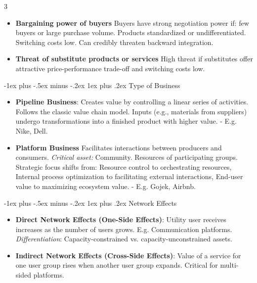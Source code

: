 \documentclass[10pt, landscape]{article}
\makeatletter
\renewcommand{\subsubsection}{\@startsection{subsubsection}{3}{0mm}%
                                {-1ex plus -.5ex minus -.2ex}%
                                {1ex plus .2ex}%
                                {\normalfont\small\bfseries}}
\makeatother
\begin{document}
\begin{multicols*}{3}
\begin{itemize}
    \item \textbf{Bargaining power of buyers}  
        Buyers have strong negotiation power if:  
           few buyers or large purchase volume.  
           Products standardized or undifferentiated.  
           Switching costs low.  
           Can credibly threaten backward integration.  

    \item \textbf{Threat of substitute products or services}  
        High threat if substitutes offer attractive price-performance trade-off and switching costs low.  
\end{itemize}

\subsubsection{Type of Business}
\begin{itemize}
    \item \textbf{Pipeline Business}: Creates value by controlling a linear series of activities. 
	Follows the classic value chain model.  Inputs (e.g., materials from suppliers) undergo transformations into a finished product with higher value.  
        - E.g. Nike, Dell.  

    \item \textbf{Platform Business}  
        Facilitates interactions between producers and consumers. 
        \textit{Critical asset:}  Community. Resources of participating groups.  
        Strategic focus shifts from: Resource control to orchestrating resources,
            Internal process optimization to facilitating external interactions,
            End-user value to maximizing ecosystem value.  
        - E.g. Gojek, Airbnb.  
\end{itemize}

\subsubsection{Network Effects}
\begin{itemize}
    \item \textbf{Direct Network Effects (One-Side Effects)}:
        Utility user receives increases as the number of users grows. E.g. Communication platforms.  
        \textit{Differentiation}: Capacity-constrained vs. capacity-unconstrained assets.  
    \item \textbf{Indirect Network Effects (Cross-Side Effects)}:
        Value of a service for one user group rises when another user group expands. Critical for multi-sided platforms.  
\end{itemize}



\end{multicols*}
\end{document}
